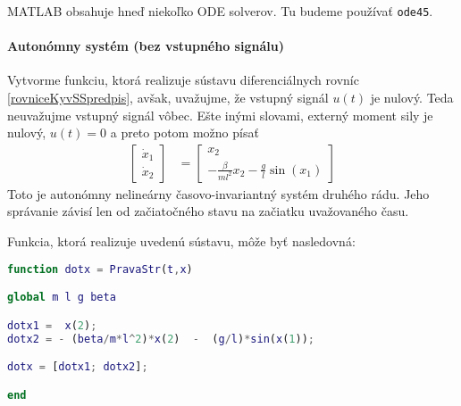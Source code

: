 \documentclass[a4paper, 10pt, ]{article}
\begin{document}
MATLAB obsahuje hneď niekoľko ODE solverov. Tu budeme používať \verb|ode45|.


\paragraph{Autonómny systém (bez vstupného signálu)}

Vytvorme funkciu, ktorá realizuje sústavu diferenciálnych rovníc \eqref{rovniceKyvSSpredpis}, avšak, uvažujme, že vstupný signál $u(t)$ je nulový. Teda neuvažujme vstupný signál vôbec. Ešte inými slovami, externý moment sily je nulový, $u(t) = 0$ a preto potom možno písať
\begin{align} \label{fajnVektRov0}
	\begin{bmatrix}
		\dot{x}_1 \\ \dot{x}_2
	\end{bmatrix}
	&=
	\begin{bmatrix}
		x_2 \\ - \frac{\beta}{ml^2} x_2 - \frac{g}{l} \sin(x_1)
	\end{bmatrix}
\end{align}
Toto je autonómny nelineárny časovo-invariantný systém druhého rádu. Jeho správanie závisí len od začiatočného stavu na začiatku uvažovaného času.

Funkcia, ktorá realizuje uvedenú sústavu, môže byť nasledovná:

\lstset{style=mystyle}
\begin{lstlisting}[language=Matlab, title=Celý súbor PravaStr.m]
function dotx = PravaStr(t,x)

global m l g beta

dotx1 =  x(2);
dotx2 = - (beta/m*l^2)*x(2)  -  (g/l)*sin(x(1));

dotx = [dotx1; dotx2];

end
\end{lstlisting}
\end{document}
